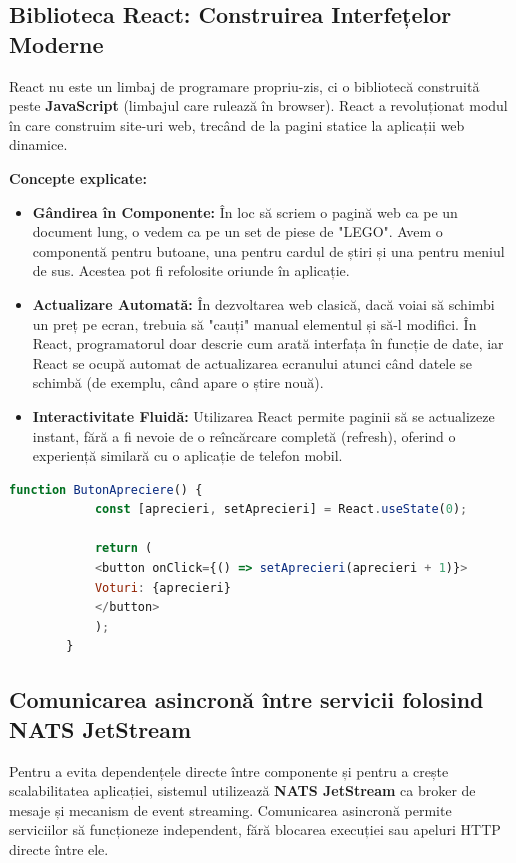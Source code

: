 \documentclass[12pt,a4paper]{article}
\begin{document}
	\newpage
	
	\subsection{Biblioteca React: Construirea Interfețelor Moderne}
	
	React nu este un limbaj de programare propriu-zis, ci o bibliotecă construită peste \textbf{JavaScript} (limbajul care rulează în browser). React a revoluționat modul în care construim site-uri web, trecând de la pagini statice la aplicații web dinamice.
	
	\textbf{Concepte explicate:}
	\begin{itemize}
		\item \textbf{Gândirea în Componente:} În loc să scriem o pagină web ca pe un document lung, o vedem ca pe un set de piese de "LEGO". Avem o componentă pentru butoane, una pentru cardul de știri și una pentru meniul de sus. Acestea pot fi refolosite oriunde în aplicație.
		\item \textbf{Actualizare Automată:} În dezvoltarea web clasică, dacă voiai să schimbi un preț pe ecran, trebuia să "cauți" manual elementul și să-l modifici. În React, programatorul doar descrie cum arată interfața în funcție de date, iar React se ocupă automat de actualizarea ecranului atunci când datele se schimbă (de exemplu, când apare o știre nouă).
		\item \textbf{Interactivitate Fluidă:} Utilizarea React permite paginii să se actualizeze instant, fără a fi nevoie de o reîncărcare completă (refresh), oferind o experiență similară cu o aplicație de telefon mobil.
	\end{itemize}
	
	\begin{lstlisting}[language=JavaScript, caption=Exemplu de componenta React]
		function ButonApreciere() {
			const [aprecieri, setAprecieri] = React.useState(0);
			
			return (
			<button onClick={() => setAprecieri(aprecieri + 1)}>
			Voturi: {aprecieri}
			</button>
			);
		}
	\end{lstlisting}
	
	\newpage
	
	
	\subsection{Comunicarea asincronă între servicii folosind NATS JetStream}
	
	Pentru a evita dependențele directe între componente și pentru a crește scalabilitatea aplicației, sistemul utilizează \textbf{NATS JetStream} ca broker de mesaje și mecanism de event streaming. Comunicarea asincronă permite serviciilor să funcționeze independent, fără blocarea execuției sau apeluri HTTP directe între ele.
	
\end{document}
